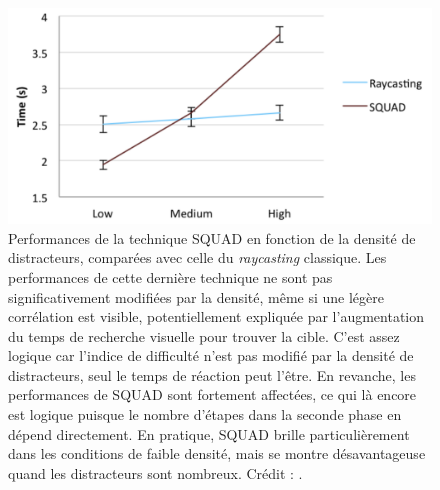 	\begin{figure}[ht]
		\centering
		\includegraphics[width=\textwidth]{figures/ch2/squadDensity}
		\caption[SQUAD -- résultats : densité]{Performances de la technique SQUAD en fonction de la densité de distracteurs, comparées avec celle du \emph{raycasting} classique. Les performances de cette dernière technique ne sont pas significativement modifiées par la densité, même si une légère corrélation est visible, potentiellement expliquée par l'augmentation du temps de recherche visuelle pour trouver la cible. C'est assez logique car l'indice de difficulté n'est pas modifié par la densité de distracteurs, seul le temps de réaction peut l'être. En revanche, les performances de SQUAD sont fortement affectées, ce qui là encore est logique puisque le nombre d'étapes dans la seconde phase en dépend directement. En pratique, SQUAD brille particulièrement dans les conditions de faible densité, mais se montre désavantageuse quand les distracteurs sont nombreux. Crédit : \cite{kopper2011rapid}.}
		\label{fig:squadDensity}
	\end{figure}
	
